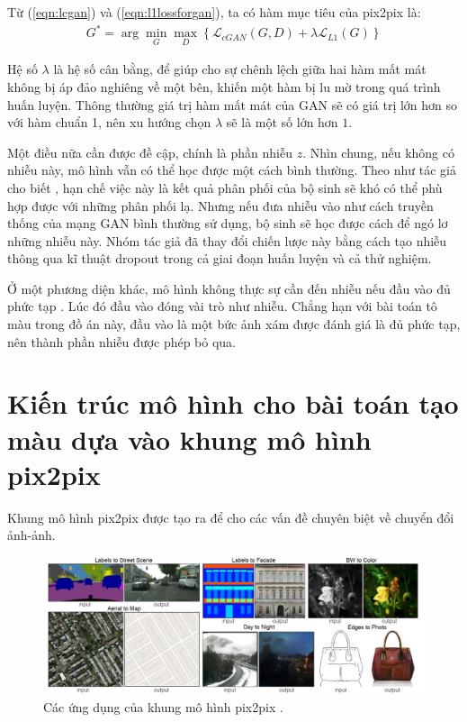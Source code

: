 \documentclass[a4paper, 12pt]{report}
\begin{document}
Từ (\ref{eqn:lcgan}) và (\ref{eqn:l1lossforgan}), ta có hàm mục tiêu của pix2pix là:
\begin{align}
    G^* = \arg\min_G\max_D\left\{\mathcal{L}_{cGAN}\left(G, D\right) + \lambda\mathcal{L}_{L1}\left(G\right)\right\}\label{eqn:losspix2pix}
\end{align}

Hệ số $\lambda$ là hệ số cân bằng, để giúp cho sự chênh lệch giữa hai hàm mất mát không bị áp đảo nghiêng về một bên, khiến một hàm bị lu mờ trong quá trình huấn luyện.
Thông thường giá trị hàm mất mát của GAN sẽ có giá trị lớn hơn so với hàm chuẩn 1, nên xu hướng chọn $\lambda$ sẽ là một số lớn hơn $1$.\vspace{5pt}

Một điều nữa cần được đề cập, chính là phần nhiễu $z$.
Nhìn chung, nếu không có nhiễu này, mô hình vẫn có thể học được một cách bình thường.
Theo như tác giả cho biết \cite{isola2018imagetoimage}, hạn chế việc này là kết quả phân phối của bộ sinh sẽ khó có thể phù hợp được với những phân phối lạ.
Nhưng nếu đưa nhiễu vào như cách truyền thống của mạng GAN bình thường sử dụng, bộ sinh sẽ học được cách để ngó lơ những nhiễu này.
Nhóm tác giả đã thay đổi chiến lược này bằng cách tạo nhiễu thông qua kĩ thuật dropout \cite{dropouthinton2014} trong cả giai đoạn huấn luyện và cả thử nghiệm.\vspace{5pt}

Ở một phương diện khác, mô hình không thực sự cần đến nhiễu nếu đầu vào đủ phức tạp \cite{replyrandomnoisez}.
Lúc đó đầu vào đóng vài trò như nhiễu.
Chẳng hạn với bài toán tô màu trong đồ án này, đầu vào là một bức ảnh xám được đánh giá là đủ phức tạp, nên thành phần nhiễu được phép bỏ qua.


\chapter{Kiến trúc mô hình cho bài toán tạo màu dựa vào khung mô hình pix2pix}\label{mainarchitecture}

Khung mô hình pix2pix được tạo ra để cho các vấn đề chuyên biệt về chuyển đổi ảnh-ảnh.

\begin{figure}[!h]
\captionsetup{width=0.8\textwidth}
\centering
\includegraphics[width=15cm]{images/appofpix2pix.jpg}
\caption{Các ứng dụng của khung mô hình pix2pix \cite{isola2018imagetoimage}.}
\label{fig:appofpix2pix}
\end{figure}
\end{document}
